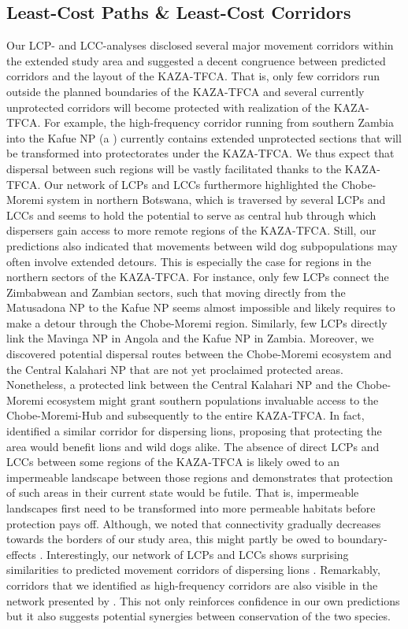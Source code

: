 \documentclass[abstract=on,10pt,a4paper,bibliography=totocnumbered]{scrartcl}
\newcommand*\circled[1]{\tikz[baseline=(char.base)]{
            \node[shape=circle,draw,inner sep=1pt] (char) {#1};}}
\begin{document}
\subsection{Least-Cost Paths \& Least-Cost Corridors}
Our LCP- and LCC-analyses disclosed several major movement corridors within the
extended study area and suggested a decent congruence between predicted
corridors and the layout of the KAZA-TFCA. That is, only few corridors run
outside the planned boundaries of the KAZA-TFCA and several currently
unprotected corridors will become protected with realization of the KAZA-TFCA.
For example, the high-frequency corridor running from southern Zambia into the
Kafue NP (a \circled{3}) currently contains extended unprotected
sections that will be transformed into protectorates under the KAZA-TFCA. We
thus expect that dispersal between such regions will be vastly facilitated
thanks to the KAZA-TFCA. Our network of LCPs and LCCs furthermore highlighted
the Chobe-Moremi system in northern Botswana, which is traversed by several
LCPs and LCCs and seems to hold the potential to serve as central hub through
which dispersers gain access to more remote regions of the KAZA-TFCA. Still, our
predictions also indicated that movements between wild dog subpopulations may
often involve extended detours. This is especially the case for regions in the
northern sectors of the KAZA-TFCA. For instance, only few LCPs connect the
Zimbabwean and Zambian sectors, such that moving directly from the Matusadona NP
to the Kafue NP seems almost impossible and likely requires to make a detour
through the Chobe-Moremi region. Similarly, few LCPs directly link the Mavinga
NP in Angola and the Kafue NP in Zambia. Moreover, we discovered potential
dispersal routes between the Chobe-Moremi ecosystem and the Central Kalahari
NP that are not yet proclaimed protected areas. Nonetheless, a protected link
between the Central Kalahari NP and the Chobe-Moremi ecosystem might grant
southern populations invaluable access to the Chobe-Moremi-Hub and
subsequently to the entire KAZA-TFCA. In fact, \cite{Elliot.2014} identified a
similar corridor for dispersing lions, proposing that protecting the area would
benefit lions and wild dogs alike. The absence of direct LCPs and LCCs between
some regions of the KAZA-TFCA is likely owed to an impermeable landscape between
those regions and demonstrates that protection of such areas in their current
state would be futile. That is, impermeable landscapes first need to be
transformed into more permeable habitats before protection pays off. Although,
we noted that connectivity gradually decreases towards the borders of our study
area, this might partly be owed to boundary-effects \citep{Koen.2010}.
Interestingly, our network of LCPs and LCCs shows surprising similarities to
predicted movement corridors of dispersing lions \citep{Elliot.2014}.
Remarkably, corridors that we identified as high-frequency corridors are also
visible in the network presented by \cite{Elliot.2014}. This not only reinforces
confidence in our own predictions but it also suggests potential synergies
between conservation of the two species.
\end{document}
